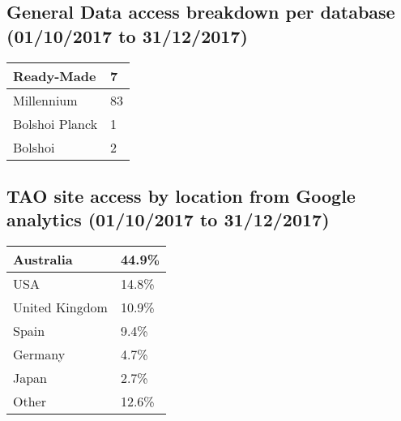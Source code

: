 \documentclass{article}%
\begin{document}
\subsection{General Data access breakdown per database (01/10/2017 to 31/12/2017)}%

%
\begin{longtabu}{X[l] X[l]}%
Ready{-}Made&7\\%
\hline%
Millennium&83\\%
\hline%
Bolshoi Planck&1\\%
\hline%
Bolshoi&2\\%
\hline%
\end{longtabu}%
\subsection{TAO site access by location from Google analytics (01/10/2017 to 31/12/2017)}%

%
\begin{longtabu}{X[l] X[l]}%
Australia&44.9\%\\%
\hline%
USA&14.8\%\\%
\hline%
United Kingdom&10.9\%\\%
\hline%
Spain&9.4\%\\%
\hline%
Germany&4.7\%\\%
\hline%
Japan&2.7\%\\%
\hline%
Other&12.6\%\\%
\hline%
\end{longtabu}%
\end{document}
